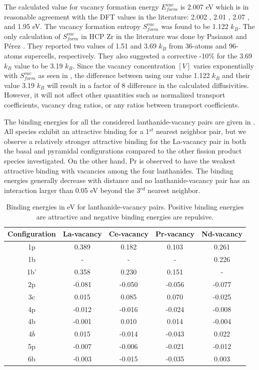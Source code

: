 \documentclass[preprint,12pt]{elsarticle}
\begin{document}
The calculated value for vacancy formation energy $E_{form}^{vac}$ is 2.007 eV which is in reasonable agreement with the DFT values in the literature: 2.002 \cite{jain_first-principles_2019}, 2.01 \cite{lu_first-principles_2018}, 2.07 \cite{varvenne_vacancy_2014}, and 1.95 \cite{pasianot_issues_2012} eV. The vacancy formation entropy $S_{form}^{vac}$ was found to be 1.122 $k_B$. The only calculation of $S_{form}^{vac}$ in HCP Zr in the literature was done by Pasianot and P\'erez \cite{pasianot_issues_2012}. They reported two values of 1.51 and 3.69 $k_B$ from 36-atoms and 96-atoms supercells, respectively. They also suggested a corrective -10\% for the 3.69 $k_B$ value to be 3.19 $k_B$. Since the vacancy concentration $[V]$ varies exponentially with $S_{form}^{vac}$ as seen in , the difference between using our value 1.122 $k_B$ and their value 3.19 $k_B$ \cite{pasianot_issues_2012} will result in a factor of 8 difference in the calculated diffusivities. However, it will not affect other quantities such as normalized transport coefficients, vacancy drag ratios, or any ratios between transport coefficients. 

The binding energies for all the considered lanthanide-vacancy pairs are given in . All species exhibit an attractive binding for a 1$^{st}$ nearest neighbor pair, but we observe a relatively stronger attractive binding for the La-vacancy pair in both the basal and pyramidal configurations compared to the other fission product species investigated. 
On the other hand, Pr is observed to have the weakest attractive binding with vacancies among the four lanthanides. The binding energies generally decrease with distance and no lanthanide-vacancy pair has an interaction larger than 0.05 eV beyond the 3$^{rd}$ nearest neighbor. 

\begin{table}[h!]
    \centering
    \caption{Binding energies in eV for lanthanide-vacancy pairs. Positive binding energies are attractive and negative binding energies are repulsive.}
    \label{tab:BE}
    \begin{tabular}{c|c|c|c|c}
        \toprule
       Configuration & La-vacancy & Ce-vacancy & Pr-vacancy & Nd-vacancy  \\
       \hline
       1p &0.389 &0.182 &0.103 &0.261 \\
       1b &- &- &- &0.226 \\
       1b' &0.358 &0.230 &0.151 &- \\
       2p &-0.081 &-0.050 &-0.056 &-0.077 \\
       3c &0.015 &0.085 &0.070 &-0.025 \\
       4p &-0.012 &-0.016 &-0.024 &-0.008 \\
       4b &-0.001 &0.010 &0.014 &-0.004 \\
       4$\overline{b}$ &0.015 &-0.014 &-0.043 &0.022 \\
       5p &-0.007 &-0.006 &-0.021 &-0.012 \\
       6b &-0.003 &-0.015 &-0.035 &0.003 \\
       \bottomrule
    \end{tabular}
\end{table}
\end{document}
